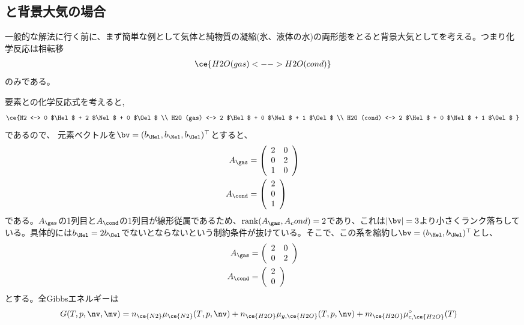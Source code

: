 \subsection{と背景大気の場合}
一般的な解法に行く前に、まず簡単な例として気体と純物質の凝縮(氷、液体の水)の両形態をとると背景大気としてを考える。つまり化学反応は相転移
\begin{align*}
\ce{H2O (gas) <--> H2O (cond)}
\end{align*}
のみである。


要素との化学反応式を考えると,
\begin{align*}
\ce{N2 <-->  0 $\Hel$ + 2 $\Nel$ + 0 $\Oel$ \\
H2O (gas) <--> 2 $\Hel$ + 0 $\Nel$ + 1 $\Oel$ \\
H2O (cond) <--> 2 $\Hel$ + 0 $\Nel$ + 1 $\Oel$ 
}
\end{align*}
であるので、
元素ベクトルを$\bv = (b_{\Hel}, b_{\Nel}, b_{\Oel})^\top$とすると、
\begin{align}
    A_\gas &=  \left(
\begin{array}{cc}
2 & 0 \\
0 & 2 \\
1 & 0
\end{array}
\right) \\
 A_\cond &=  \left(
\begin{array}{cc}
2 \\
0  \\
1 
\end{array}
\right) 
\end{align}
である。$A_\gas$の1列目と$A_\cond$の1列目が線形従属であるため、$\mathrm{rank} (A_\gas, A_cond) =2$であり、これは$|\bv|=3$より小さくランク落ちしている。具体的には$b_\Hel = 2 b_\Oel$でないとならないという制約条件が抜けている。そこで、この系を縮約し$\bv = (b_{\Hel}, b_{\Nel})^\top$とし、
\begin{align}
    A_\gas &=  \left(
\begin{array}{cc}
2 & 0 \\
0 & 2 \\
\end{array}
\right) \\
 A_\cond &=  \left(
\begin{array}{cc}
2 \\
0  \\
\end{array}
\right) 
\end{align}
とする。全Gibbsエネルギーは
\begin{align}
    G (T, p, \nv, \mv) &= n_{\ce{N2}} \mu_{\ce{N2}} (T, p, \nv) + n_{\ce{H2O}} \mu_{g,\ce{H2O}} (T, p, \nv) + m_{\ce{H2O}} \mu^\circ_{c, \ce{H2O}} (T)
\end{align}

